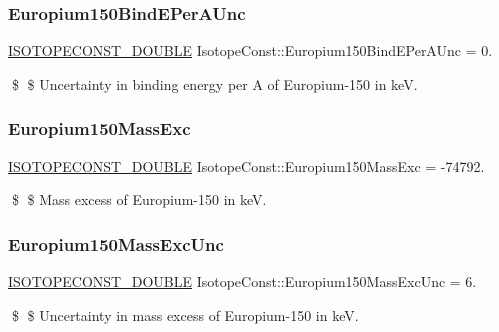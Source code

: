 \subsubsection{\texorpdfstring{Europium150\+Bind\+E\+Per\+A\+Unc}{Europium150BindEPerAUnc}}
{\footnotesize\ttfamily \mbox{\hyperlink{group___isotope_const-_macros_ga8f45a7272ce02c0b4c65c44636ed719a}{I\+S\+O\+T\+O\+P\+E\+C\+O\+N\+S\+T\+\_\+\+D\+O\+U\+B\+LE}} Isotope\+Const\+::\+Europium150\+Bind\+E\+Per\+A\+Unc = 0.}

\$ \$ Uncertainty in binding energy per A of Europium-\/150 in keV. \mbox{\label{group___isotope_const-_europium-_eu150_gaae96f380e3e9037978fbd80fce1fcd37}} 
\subsubsection{\texorpdfstring{Europium150\+Mass\+Exc}{Europium150MassExc}}
{\footnotesize\ttfamily \mbox{\hyperlink{group___isotope_const-_macros_ga8f45a7272ce02c0b4c65c44636ed719a}{I\+S\+O\+T\+O\+P\+E\+C\+O\+N\+S\+T\+\_\+\+D\+O\+U\+B\+LE}} Isotope\+Const\+::\+Europium150\+Mass\+Exc = -\/74792.}

\$ \$ Mass excess of Europium-\/150 in keV. \mbox{\label{group___isotope_const-_europium-_eu150_gadeaaf51ad15ee791c74b1464d01d11c4}} 
\subsubsection{\texorpdfstring{Europium150\+Mass\+Exc\+Unc}{Europium150MassExcUnc}}
{\footnotesize\ttfamily \mbox{\hyperlink{group___isotope_const-_macros_ga8f45a7272ce02c0b4c65c44636ed719a}{I\+S\+O\+T\+O\+P\+E\+C\+O\+N\+S\+T\+\_\+\+D\+O\+U\+B\+LE}} Isotope\+Const\+::\+Europium150\+Mass\+Exc\+Unc = 6.}

\$ \$ Uncertainty in mass excess of Europium-\/150 in keV. \mbox{\label{group___isotope_const-_europium-_eu150_ga8e7cdd0af095c36938527eb7a54f9ee3}} 
